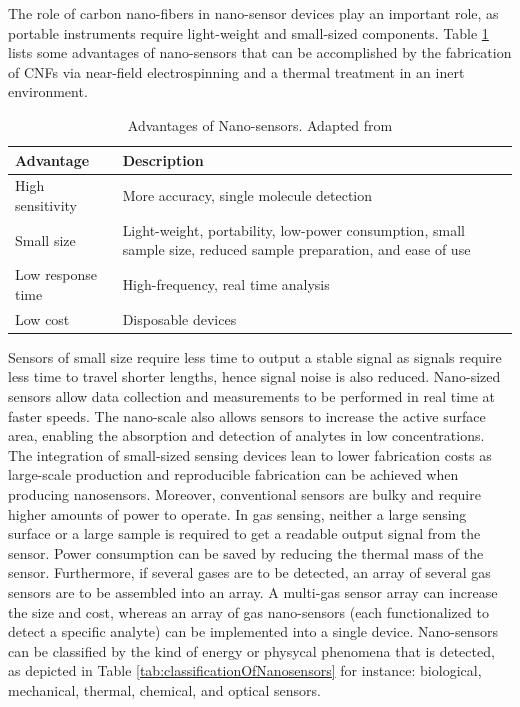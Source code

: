 
The role of carbon nano-fibers in nano-sensor devices play an important role, as portable instruments require light-weight and small-sized components. \cite{Khanna2016} Table \ref{tab:advantagesOfNanosensors} lists some advantages of nano-sensors that can be accomplished by the fabrication of CNFs via near-field electrospinning and a thermal treatment in an inert environment.

\begin{table}[ht]
\centering
\caption[Advantages of Nano-sensors]{Advantages of Nano-sensors. Adapted from \cite{Khanna2016}}
\begin{tabularx}{\textwidth}{lX}
\hline
\textbf{Advantage} & \textbf{Description} \\
\hline
High sensitivity & More accuracy, single molecule detection \\
Small size & Light-weight, portability, low-power consumption, small sample size, reduced sample preparation, and ease of use \\
Low response time & High-frequency, real time analysis \\
Low cost & Disposable devices \\
\hline
\end{tabularx}
\label{tab:advantagesOfNanosensors}
\end{table}

Sensors of small size require less time to output a stable signal as signals require less time to travel shorter lengths, hence signal noise is also reduced. Nano-sized sensors allow data collection and measurements to be performed in real time at faster speeds. \cite{Khanna2016} The nano-scale also allows sensors to increase the active surface area, enabling the absorption and detection of analytes in low concentrations. \cite{Khanna2016} The integration of small-sized sensing devices lean to lower fabrication costs as large-scale production and reproducible fabrication can be achieved when producing nanosensors. \cite{Khanna2016} Moreover, conventional sensors are bulky and require higher amounts of power to operate. In gas sensing, neither a large sensing surface or a large sample is required to get a readable output signal from the sensor. Power consumption can be saved by reducing the thermal mass of the sensor. \cite{Khanna2016} Furthermore, if several gases are to be detected, an array of several gas sensors are to be assembled into an array. A multi-gas sensor array can increase the size and cost, whereas an array of gas nano-sensors (each functionalized to detect a specific analyte) can be implemented into a single device. \cite{Khanna2016} Nano-sensors can be classified by the kind of energy or physycal phenomena that is detected, as depicted in Table \ref{tab:classificationOfNanosensors} for instance: biological, mechanical, thermal, chemical, and optical sensors. \cite{Khanna2016, BaudritJ2017}

